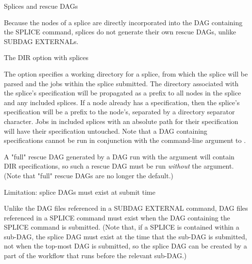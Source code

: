 \begin{description}
\item[Splices and rescue DAGs]
\end{description}

Because the nodes of a splice are directly incorporated into the
DAG containing the SPLICE command, splices do not generate their
own rescue DAGs, unlike SUBDAG EXTERNALs.

\begin{description}
\item[The DIR option with splices]
\end{description}

The  option specifies a working directory for a splice,
from which the splice will be parsed and the jobs within the splice submitted.
The directory associated with the splice's  specification
will be propagated as a prefix to all nodes in the splice and any 
included splices.
If a node already has a  specification, then the splice's
 specification will be a prefix to the node's, separated by
a directory separator character.
Jobs in included splices with an absolute path for their 
specification will have their  specification untouched.
Note that a DAG containing  specifications cannot be run
in conjunction with the  command-line argument to
.

A "full" rescue DAG generated by a DAG run with the  argument
will contain DIR specifications, so such a rescue DAG must be run
\emph{without} the  argument.  (Note that "full"
rescue DAGs are no longer the default.)


\begin{description}
\item[Limitation: splice DAGs must exist at submit time]
\end{description}
Unlike the DAG files referenced in a SUBDAG EXTERNAL command, DAG files
referenced in a SPLICE command must exist when the DAG containing the
SPLICE command is submitted.  (Note that, if a SPLICE is contained
within a sub-DAG, the splice DAG must exist at the time that the
sub-DAG is submitted, not when the top-most DAG is submitted, so the
splice DAG can be created by a part of the workflow that runs before
the relevant sub-DAG.)

